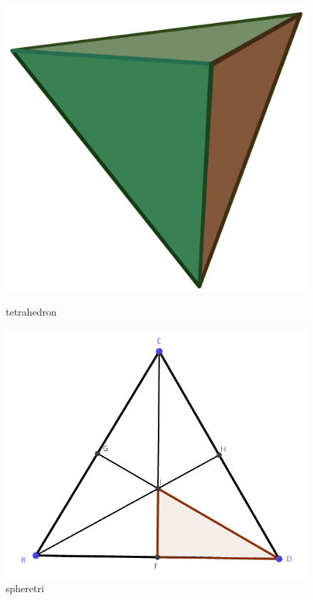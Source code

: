 \documentclass{article}
\begin{document}
\begin{figure}[ht]
    \centering
    \begin{minipage}{0.32\linewidth}
        \includegraphics[width=0.9\linewidth]{tetrahedron.jpg}
        \caption{tetrahedron}
        \label{tetrahedron}
    \end{minipage}
    \begin{minipage}{0.32\linewidth}
        \includegraphics[width=0.9\linewidth]{spheretri.png}
        \caption{spheretri}
        \label{sphere_tri}
    \end{minipage}
    \begin{minipage}{0.32\linewidth}

\end{minipage}
\end{figure}
\end{document}
